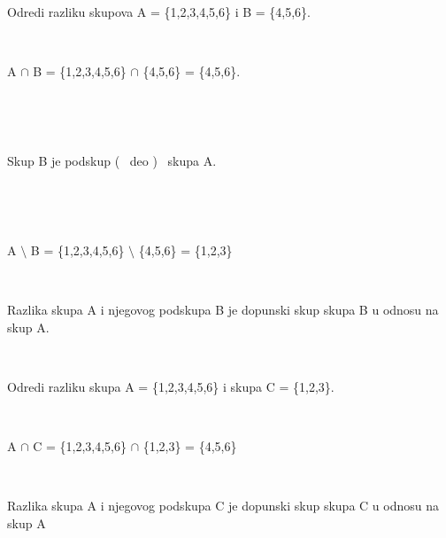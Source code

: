 \begin{zad}

    Odredi razliku skupova A = \{1,2,3,4,5,6\} i B = \{4,5,6\}.

    \ 





    A $\cap$ B = \{1,2,3,4,5,6\} $\cap$ \{4,5,6\} = \{4,5,6\}.

\ 

\

    Skup B je podskup ( \ deo ) \ skupa A. 

\ 

\ 





    A $\setminus$ B = \{1,2,3,4,5,6\} $\setminus$ \{4,5,6\} = \{1,2,3\}

 \ 



  \begin{figure}[h] 

        \center


        \caption{}

\end{figure}



    Razlika skupa A i njegovog podskupa B je dopunski skup skupa B u odnosu na skup A.

    \ 



    Odredi razliku skupa A = \{1,2,3,4,5,6\} i skupa C = \{1,2,3\}. 

    \ 

    

    A $\cap$ C = \{1,2,3,4,5,6\} $\cap$ \{1,2,3\} = \{4,5,6\}

    \ 

    

    Razlika skupa A i njegovog podskupa C je dopunski skup skupa C u odnosu na skup A

\end{zad}

